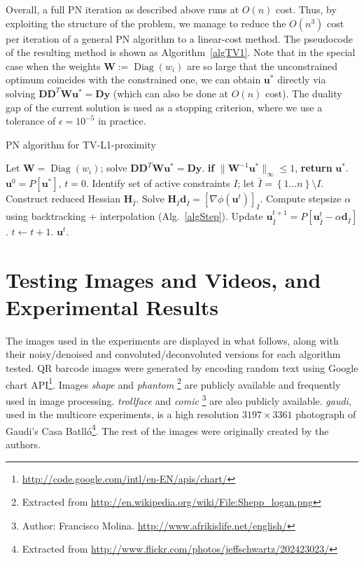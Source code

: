 \documentclass[twoside,11pt]{article}
\newcommand{\vd}{\bm{d}}       \newcommand{\vdh}{\hat{\bm{d}}}        \newcommand{\dhat}{\hat{d}}  \newcommand{\vdt}{\tilde{\bm{d}}}       \newcommand{\dt}{\tilde{d}}
\newcommand{\vu}{\bm{u}}       \newcommand{\vuh}{\hat{\bm{u}}}        \newcommand{\uh}{\hat{u}}    \newcommand{\vut}{\tilde{\bm{u}}}       \newcommand{\ut}{\tilde{u}}
\newcommand{\vy}{\bm{y}}       \newcommand{\vyh}{\hat{\bm{y}}}        \newcommand{\yh}{\hat{y}}    \newcommand{\vyt}{\tilde{\bm{y}}}       \newcommand{\yt}{\tilde{y}}
\newcommand{\md}{\bm{D}}
\newcommand{\mH}{\bm{H}}
\newcommand{\mynorm}[2]{\| {#1} \|_{#2}}
\newcommand{\infnorm}[1]{\mynorm{#1}{\infty}}
\DeclareMathOperator{\Diag}{Diag}
\newcommand{\set}[1]{\left\{ {#1}\right\}}
\numberwithin{equation}{section}
\numberwithin{theorem}{section}
\begin{document}
Overall, a full PN iteration as described above runs at $O(n)$ cost. Thus, by exploiting the structure of the problem, we manage to reduce the $O(n^3)$ cost per iteration of a general PN algorithm to a linear-cost method. The pseudocode of the resulting method is shown as  Algorithm~\ref{algTV1}. Note that in the special case when the weights $\bm{W}:=\Diag(w_i)$ are so large that the unconstrained optimum coincides with the constrained one, we can obtain $\vu^*$ directly via solving $\md\md^T\bm{W}\vu^* = \md\vy$ (which can also be done at $O(n)$ cost). The duality gap of the current solution is used as a stopping criterion, where we use a tolerance of $\epsilon = 10^{-5}$ in practice.

{\begin{algorithm}[t]
 \caption{\small PN algorithm for TV-L1-proximity}
 \label{algTV1}
 \begin{algorithmic}
  \State Let $\bm{W}=\Diag(w_i)$; solve $\md\md^T\bm{W}\vu^* = \md\vy$.
  \State \textbf{if} $\infnorm{\bm{W}^{-1}\vu^*} \le 1$, \textbf{return} $\vu^*$.
  \State $\vu^0 = P[\vu^*]$, $t = 0$.
  \While{$\text{gap}(\vu)$ $>$ $\epsilon$}
   \State Identify set of active constraints $I$; let $\bar{I}=\set{1\ldots n} \setminus I$.
   \State Construct reduced Hessian $\mH_{\bar{I}}$.
   \State Solve $\mH_{\bar{I}}\vd_{\bar{I}} = [\nabla \phi(\vu^t)]_{\bar{I}}$.
   \State Compute stepsize $\alpha$ using backtracking + interpolation (Alg.~\ref{algStep}).
   \State Update $\vu^{t+1}_{\bar{I}} = P[\vu^t_{\bar{I}} - \alpha\vd_{\bar{I}}]$.
   \State $t \gets t + 1$.
  \EndWhile
  \State\Return $\vu^t$.
 \end{algorithmic}
\end{algorithm}
}

\section{Testing Images and Videos, and Experimental Results}
\label{app:images}

The images used in the experiments are displayed in what follows, along with their noisy/denoised and convoluted/deconvoluted versions for each algorithm tested. QR barcode images were generated by encoding random text using Google chart API\footnote{\url{http://code.google.com/intl/en-EN/apis/chart/}}. Images {\it shape} and {\it phantom} \footnote{Extracted from \url{http://en.wikipedia.org/wiki/File:Shepp_logan.png}} are publicly available and frequently used in image processing. {\it trollface} and {\it comic} \footnote{Author: Francisco Molina. \url{http://www.afrikislife.net/english/}} are also publicly available. {\it gaudi}, used in the multicore experiments, is a high resolution $3197 \times 3361$ photograph of Gaudi's Casa Batll\'o\footnote{Extracted from \url{http://www.flickr.com/photos/jeffschwartz/202423023/}}. The rest of the images were originally created by the authors.
\end{document}
